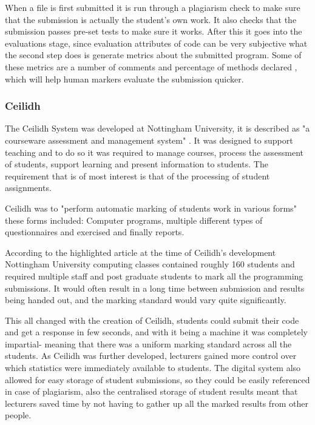 \documentclass[12pt]{article}  %
\begin{document}
When a file is first submitted it is run through a plagiarism check to make sure that the submission is actually the student’s own work. It also checks that the submission passes pre-set tests to make sure it works. After this it goes into the evaluations stage, since evaluation attributes of code can be very subjective what the second step does is generate metrics about the submitted program. Some of these metrics are a number of comments and percentage of methods declared \cite{joy_effective_1998}, which will help human markers evaluate the submission quicker.




\subsubsection{Ceilidh}

The Ceilidh System was developed at Nottingham University, it is described as "a courseware assessment and management system" \cite{benford_ceilidh:_nodate}. It was designed to support teaching and to do so it was required to manage courses, process the assessment of students, support learning and present information to students. The requirement that is of most interest is that of the processing of student assignments.

Ceilidh was to "perform automatic marking of students work in various forms" \cite{benford_ceilidh_1995} these forms included: Computer programs, multiple different types of questionnaires and exercised and finally reports. 

According to the highlighted article \cite{benford_ceilidh_1995} at the time of Ceilidh's development Nottingham University computing classes contained roughly 160 students and required multiple staff and post graduate students to mark all the programming submissions. It would often result in a long time between submission and results being handed out, and the marking standard would vary quite significantly.

This all changed with the creation of Ceilidh, students could submit their code and get a response in few seconds, and with it being a machine it was completely impartial- meaning that there was a uniform marking standard across all the students. As Ceilidh was further developed, lecturers gained more control over which statistics were immediately available to students. The digital system also allowed for easy storage of student submissions, so they could be easily referenced in case of plagiarism, also the centralised storage of student results meant that lecturers saved time by not having to gather up all the marked results from other people. 
\end{document}
